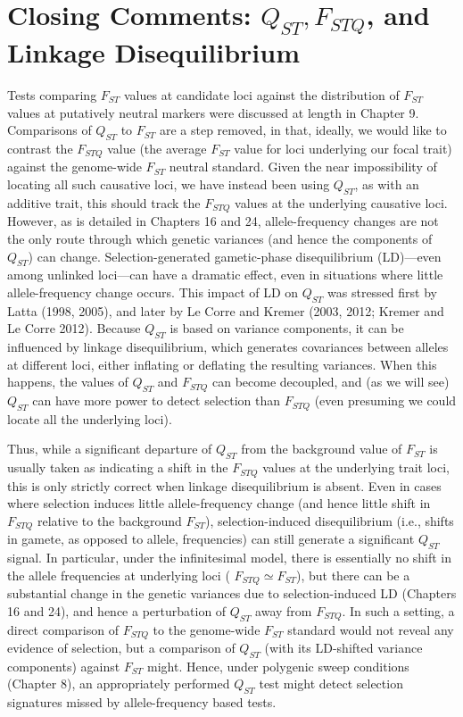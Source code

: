 \documentclass{article}
\begin{document}
\section{Closing Comments:  $ Q_{ST}, F_{STQ} $, and Linkage Disequilibrium}
Tests comparing  $ F_{ST} $ values at candidate loci against the distribution of  $ F_{ST} $ values at putatively neutral markers were discussed at length in Chapter 9. Comparisons of  $ Q_{ST} $ to  $ F_{ST} $ are a step removed, in that, ideally, we would like to contrast the  $ F_{STQ} $ value (the average  $ F_{ST} $ value for loci underlying our focal trait) against the genome-wide  $ F_{ST} $ neutral standard. Given the near impossibility of locating all such causative loci, we have instead been using  $ Q_{ST} $, as with an additive trait, this should track the  $ F_{STQ} $ values at the underlying causative loci. However, as is detailed in Chapters 16 and 24, allele-frequency changes are not the only route through which genetic variances (and hence the components of  $ Q_{ST} $) can change. Selection-generated gametic-phase disequilibrium (LD)—even among unlinked loci—can have a dramatic effect, even in situations where little allele-frequency change occurs. This impact of LD on  $ Q_{ST} $ was stressed first by Latta (1998, 2005), and later by Le Corre and Kremer (2003, 2012; Kremer and Le Corre 2012). Because  $ Q_{ST} $ is based on variance components, it can be influenced by linkage disequilibrium, which generates covariances between alleles at different loci, either inflating or deflating the resulting variances. When this happens, the values of  $ Q_{ST} $ and  $ F_{STQ} $ can become decoupled, and (as we will see)  $ Q_{ST} $ can have more power to detect selection than  $ F_{STQ} $ (even presuming we could locate all the underlying loci).

Thus, while a significant departure of  $ Q_{ST} $ from the background value of  $ F_{ST} $ is usually taken as indicating a shift in the  $ F_{STQ} $ values at the underlying trait loci, this is only strictly correct when linkage disequilibrium is absent. Even in cases where selection induces little allele-frequency change (and hence little shift in  $ F_{STQ} $ relative to the background  $ F_{ST} $), selection-induced disequilibrium (i.e., shifts in gamete, as opposed to allele, frequencies) can still generate a significant  $ Q_{ST} $ signal. In particular, under the infinitesimal model, there is essentially no shift in the allele frequencies at underlying loci ( $ F_{STQ} \simeq F_{ST} $), but there can be a substantial change in the genetic variances due to selection-induced LD (Chapters 16 and 24), and hence a perturbation of  $ Q_{ST} $ away from  $ F_{STQ} $. In such a setting, a direct comparison of  $ F_{STQ} $ to the genome-wide  $ F_{ST} $ standard would not reveal any evidence of selection, but a comparison of  $ Q_{ST} $ (with its LD-shifted variance components) against  $ F_{ST} $ might. Hence, under polygenic sweep conditions (Chapter 8), an appropriately performed  $ Q_{ST} $ test might detect selection signatures missed by allele-frequency based tests.
\end{document}
